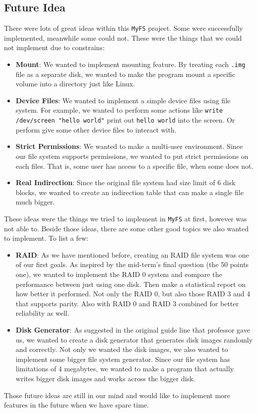 \documentclass{homework}
\begin{document}
\subsection{Future Idea}
There were lots of great ideas within this \texttt{MyFS} project. Some were successfully implemented, meanwhile some could not. These were the things that we could not implement due to constrains:
\begin{itemize}
    \item \textbf{Mount}: We wanted to implement mounting feature. By treating each \texttt{.img} file as a separate disk, we wanted to make the program mount a specific volume into a directory just like Linux.
    \item \textbf{Device Files}: We wanted to implement a simple device files using file system. For example, we wanted to perform some actions like \texttt{write /dev/screen "hello world"} print out \texttt{hello world} into the screen. Or perform give some other device files to interact with.
    \item \textbf{Strict Permissions}: We wanted to make a multi-user environment. Since our file system supports permissions, we wanted to put strict permissions on each files. That is, some user has access to a specific file, when some does not.
    \item \textbf{Real Indirection}: Since the original file system had size limit of 6 disk blocks, we wanted to create an indirection table that can make a single file much bigger.
\end{itemize}
These ideas were the things we tried to implement in \texttt{MyFS} at first, however was not able to. Beside those ideas, there are some other good topics we also wanted to implement. To list a few:
\begin{itemize}
    \item \textbf{RAID}: As we have mentioned before, creating an RAID file system was one of our first goals. As inspired by the mid-term's final question (the 50 points one), we wanted to implement the RAID 0 system and compare the performance between just using one disk. Then make a statistical report on how better it performed. Not only the RAID 0, but also those RAID 3 and 4 that supports parity. Also with RAID 0 and RAID 3 combined for better reliability as well.
    \item \textbf{Disk Generator}: As suggested in the original guide line that professor gave us, we wanted to create a disk generator that generates disk images randomly and correctly. Not only we wanted the disk images, we also wanted to implement some bigger file system generator. Since our file system has limitations of 4 megabytes, we wanted to make a program that actually writes bigger disk images and works across the bigger disk.
\end{itemize}
Those future ideas are still in our mind and would like to implement more features in the future when we have spare time.
\end{document}

